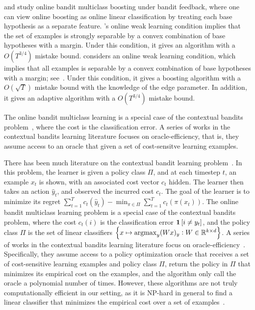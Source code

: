 \citet{Chen-Lin-Lu-2014} and \citet{Zhang-Jung-Tewari-2018} study online bandit
multiclass boosting under bandit feedback, where one can view online boosting as
online linear classification by treating each base hypothesis as a separate
feature. \citet{Chen-Lin-Lu-2014}'s online weak learning condition implies that
the set of examples is strongly separable by a convex combination of base
hypotheses with a margin. Under this condition, it gives an algorithm with a
$O(T^{3/4})$ mistake bound. \citet{Zhang-Jung-Tewari-2018} considers an online
weak learning condition, which implies that all examples is separable by a
convex combination of base hypotheses with a margin; see~\citet[Theorem
3]{Mukherjee-Schapire-2013}. Under this condition, it gives a boosting algorithm
with a $O(\sqrt{T})$ mistake bound with the knowledge of the edge parameter. In
addition, it gives an adaptive algorithm with a $O(T^{3/4})$ mistake bound.

The online bandit multiclass learning is a special case of the contextual
bandits problem~\citep{Auer-2003, Langford-Zhang-2008}, where the cost is the
classification error. A series of works in the contextual bandits learning
literature focuses on oracle-efficiency, that is, they assume access to an
oracle that given a set of cost-sensitve learning examples.

There has been much literature on the contextual bandit learning
problem~\citep{Auer-2003, Langford-Zhang-2008}. In this problem, the learner is
given a policy class $\Pi$, and at each timestep $t$, an example $x_t$ is shown,
with an associated cost vector $c_t$ hidden. The learner then takes an action
$\widehat{y}_t$, and observed the incurred cost $c_t$. The goal of the learner is to
minimize its regret $\sum_{t=1}^T c_t(\widehat{y}_t) - \min_{\pi \in \Pi}
\sum_{t=1}^T c_t(\pi(x_t))$. The online bandit multiclass learning problem is a
special case of the contextual bandits problem, where the cost $c_t(i)$ is the
classification error $\mathbf{1}\left[i \neq y_t \right]$, and the policy class $\Pi$ is the set of
linear classifiers $\cbr{x \mapsto \argmax_y (Wx)_y: W \in \R^{k \times d}}$. A
series of works in the contextual bandits learning literature focus on
oracle-efficiency~\citep{Dudik-Hsu-Kale-Karampatziakis-Langford-Reyzin-Zhang-2011,
Agarwal-Hsu-Kale-Langford-Li-Schapire-2014, Rakhlin-Sridharan-2016,
Syrgkanis-Krishnamurthy-Schapire-2016,
Syrgkanis-Luo-Krishnamurthy-Schapire-2016}. Specifically, they assume access to
a policy optimization oracle that receives a set of cost-sensitive learning
examples and policy class $\Pi$, return the policy in $\Pi$ that minimizes its
empirical cost on the examples, and the algorithm only call the oracle a
polynomial number of times. However, these algorithms are not truly
computationally efficient in our setting, as it is NP-hard in general to find a
linear classifier that minimizes the empirical cost over a set of
examples~\citep{Arora-Babai-Stern-Sweedyk-1997}.

